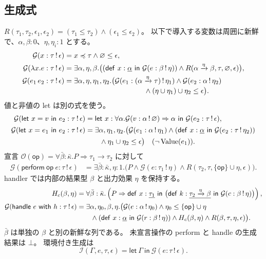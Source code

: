 \documentclass[a4paper,11pt]{article}
\theoremstyle{definition}
\newcommand{\op}{\mathsf{op}}
\newcommand{\ops}{\mathcal O}
\newcommand{\emp}{\varnothing}
\newcommand{\arr}[3]{#1\xrightarrow{#2}#3}
\newcommand{\gen}[3]{\mathcal G(#1:#2\,!\,#3)}
\newcommand{\infers}[4]{\mathcal I(#1,#2,#3,#4)}
\newcommand{\inst}[2]{#1\preccurlyeq #2}
\newcommand{\Def}[3]{\mathsf{def}\ #1:#2\ \mathsf{in}\ #3}
\newcommand{\Let}[3]{\mathsf{let}\ #1:#2\ \mathsf{in}\ #3}
\newcommand{\lete}[3]{\mathsf{let}\ #1=#2\ \mathsf{in}\ #3}
\newcommand{\perform}[2]{\mathsf{perform}\ #1\ #2}
\newcommand{\handle}[2]{\mathsf{handle}\ #1\ \mathsf{with}\ #2}
\newcommand{\mono}[1]{\underline{#1}}
\newcommand{\Val}{\operatorname{Value}}
\begin{document}
\subsection{生成式}
$R(\tau_1,\tau_2,\epsilon_1,\epsilon_2)
=(\tau_1\leq\tau_2)\land(\epsilon_1\leq\epsilon_2)$。
以下で導入する変数は周囲に新鮮で、$\alpha,\beta:0$、$\eta,\eta_i:1$ とする。
\begin{align}
 \gen x\tau\epsilon
 &=\inst x\tau\land\emp\leq\epsilon,\label{g:var}\\
 \gen{\lambda x.e}\tau\epsilon
 &=\exists\alpha,\eta,\beta.\bigl(
   (\Def x{\mono\alpha}{\gen e\beta\eta})
   \land R(\arr\alpha\eta\beta,\tau,\emp,\epsilon)\bigr),\label{g:lam}\\
 \gen{e_1\,e_2}\tau\epsilon
 &=\exists\alpha,\eta,\eta_1,\eta_2.\bigl(
   \gen{e_1}{(\arr\alpha\eta\tau)}{\eta_1}
   \land\gen{e_2}\alpha{\eta_2}\notag\\[-2pt]
 &\hspace{39mm}\land(\eta\cup\eta_1)\cup\eta_2\leq\epsilon\bigr).\label{g:app}
\end{align}
値と非値の let は別の式を使う。
\begin{align}
 \gen{\lete x v{e_2}}\tau\epsilon
 &=\Let x{\forall\alpha.\gen v\alpha\emp\Rightarrow\alpha}
          {\gen{e_2}\tau\epsilon},\label{g:poly}\\
 \gen{\lete x{e_1}{e_2}}\tau\epsilon
 &=\exists\alpha,\eta_1,\eta_2.\bigl(
   \gen{e_1}\alpha{\eta_1}
   \land(\Def x{\mono\alpha}{\gen{e_2}\tau{\eta_2}})
   \notag\\
 &\qquad\land\eta_1\cup\eta_2\leq\epsilon\bigr)
   \quad(\neg\Val(e_1)).\label{g:mono}
\end{align}
宣言 $\ops(\op)=\forall\bar\beta:\bar\kappa.P\Rightarrow\tau_1\to\tau_2$ に対して
\begin{align}
 \gen{\perform\op e}\tau\epsilon
 &=\exists\bar\beta:\bar\kappa,\eta:1.\bigl(
 P\land\gen e{\tau_1}\eta
 \land R(\tau_2,\tau,\{\op\}\cup\eta,\epsilon)\bigr).\label{g:perform}
\end{align}
handler では内部の結果型 $\beta$ と出力効果 $\eta$ を保持する。
\begin{align}
 H_c(\beta,\eta)
 &=\forall\bar\beta:\bar\kappa.\left(
 P\Rightarrow\Def x{\mono{\tau_1}}
    {\bigl(\Def k{\mono{\arr{\tau_2}\eta\beta}}{\gen c\beta\eta}\bigr)}\right),
 \label{g:clause}\\
 \gen{\handle e h}\tau\epsilon
 &=\exists\alpha,\eta_0,\beta,\eta.\bigl(
 \gen e\alpha{\eta_0}\land\eta_0\leq\{\op\}\cup\eta\notag\\
 &\qquad\land(\Def x{\mono\alpha}{\gen r\beta\eta})
 \land H_c(\beta,\eta)\land R(\beta,\tau,\eta,\epsilon)\bigr).\label{g:handle}
\end{align}
$\bar\beta$ は単独の $\beta$ と別の新鮮な列である。
未宣言操作の perform と handle の生成結果は $\bot$。
環境付き生成は
\begin{equation}\label{eq:infer}
 \infers\Gamma e\tau\epsilon
 =\mathsf{let}\ \Gamma\ \mathsf{in}\ \gen e\tau\epsilon.
\end{equation}
\end{document}
